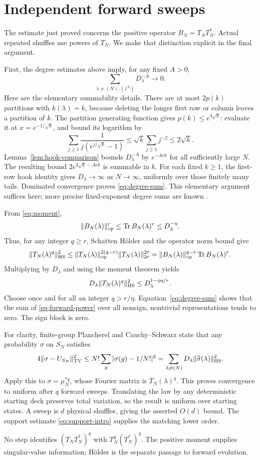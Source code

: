 \section{Independent forward sweeps}\label{sec:amplification}
The estimate just proved concerns the positive operator $B_N=T_NT_N^*$. Actual repeated shuffles use powers of $T_N$. We make that distinction explicit in the final argument.

First, the degree estimates above imply, for any fixed $A>0$,
\begin{equation}\label{eq:degree-sum}
 \sum_{\lambda\ne(N),(1^N)}D_\lambda^{-A}\longrightarrow0.
\end{equation}
Here are the elementary summability details. There are at most $2p(k)$ partitions with $k(\lambda)=k$, because deleting the longer first row or column leaves a partition of $k$. The partition generating function gives $p(k)\le e^{3\sqrt k}$: evaluate it at $x=e^{-1/\sqrt k}$, and bound its logarithm by
\[
 \sum_{j\ge1}\frac1{j(e^{j/\sqrt k}-1)}
 \le\sqrt k\sum_{j\ge1}j^{-2}\le2\sqrt k.
\]
Lemma~\ref{lem:hook-comparison} bounds $D_\lambda^{-A}$ by $e^{-Ac k}$ for all sufficiently large $N$. The resulting bound $2e^{3\sqrt k-Ack}$ is summable in $k$. For each fixed $k\ge1$, the first-row hook identity gives $D_\lambda\to\infty$ as $N\to\infty$, uniformly over those finitely many tails. Dominated convergence proves \eqref{eq:degree-sum}. This elementary argument suffices here; more precise fixed-exponent degree sums are known \cite{liebeck-shalev2004}.

From \eqref{eq:moment},
\[
 \|B_N(\lambda)\|_{\operatorname{op}}^r\le\operatorname{Tr} B_N(\lambda)^r
 \le D_\lambda^{-\eta}.
\]
Thus, for any integer $q\ge r$, Schatten H\"older and the operator norm bound give
\[
 \|T_N(\lambda)^q\|_{\mathrm{HS}}^2
 \le\|T_N(\lambda)\|_{\operatorname{op}}^{2(q-r)}
                 \|T_N(\lambda)\|_{2r}^{2r}
 =\|B_N(\lambda)\|_{\operatorname{op}}^{q-r}\operatorname{Tr} B_N(\lambda)^r.
\]
Multiplying by $D_\lambda$ and using the moment theorem yields
\begin{equation}\label{eq:forward-power}
 D_\lambda\|T_N(\lambda)^q\|_{\mathrm{HS}}^2
 \le D_\lambda^{1-\eta q/r}.
\end{equation}
Choose once and for all an integer $q>r/\eta$. Equation~\eqref{eq:degree-sum} shows that the sum of \eqref{eq:forward-power} over all nonsign, nontrivial representations tends to zero. The sign block is zero.

For clarity, finite-group Plancherel and Cauchy--Schwarz state that any probability $\sigma$ on $S_N$ satisfies
\[
 4\|\sigma-U_{S_N}\|_{\operatorname{TV}}^2
 \le N!\sum_g|\sigma(g)-1/N!|^2
 =\sum_{\lambda\ne(N)}D_\lambda
                     \|\widehat\sigma(\lambda)\|_{\mathrm{HS}}^2.
\]
Apply this to $\sigma=\mu_N^{*q}$, whose Fourier matrix is $T_N(\lambda)^q$. This proves convergence to uniform after $q$ forward sweeps. Translating the law by any deterministic starting deck preserves total variation, so the result is uniform over starting states. A sweep is $d$ physical shuffles, giving the asserted $O(d)$ bound. The support estimate \eqref{eq:support-intro} supplies the matching lower order.

No step identifies $(T_NT_N^*)^q$ with $T_N^q(T_N^*)^q$. The positive moment supplies singular-value information; H\"older is the separate passage to forward evolution.
